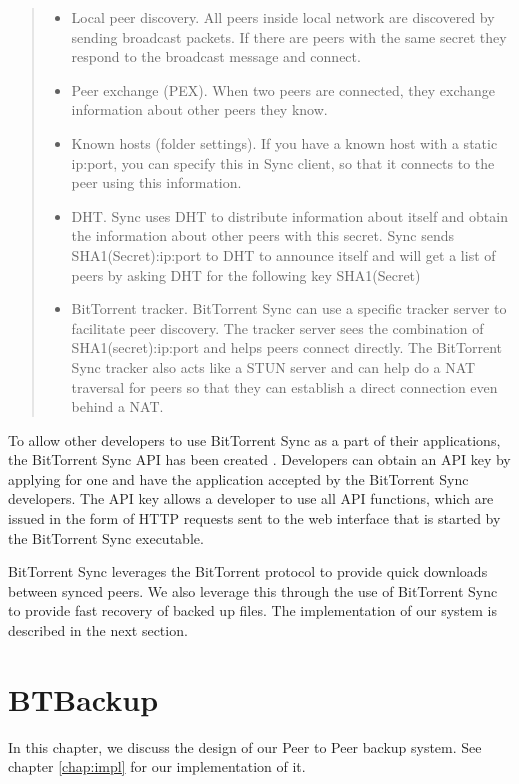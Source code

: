 \documentclass[12pt]{report}
\begin{document}
\begin{quote}
\begin{itemize}
\item Local peer discovery. All peers inside local network are discovered by sending broadcast packets. If there are peers with the same secret they respond to the broadcast message and connect.
\item Peer exchange (PEX). When two peers are connected, they exchange information about other peers they know.
\item Known hosts (folder settings). If you have a known host with a static ip:port, you can specify this in Sync client, so that it connects to the peer using this information.
\item DHT. Sync uses DHT to distribute information about itself and obtain the information about other peers with this secret. Sync sends SHA1(Secret):ip:port to DHT to announce itself and will get a list of peers by asking DHT for the following key SHA1(Secret)
\item BitTorrent tracker. BitTorrent Sync can use a specific tracker server to facilitate peer discovery. The tracker server sees the combination of SHA1(secret):ip:port and helps peers connect directly. The BitTorrent Sync tracker also acts like a STUN server and can help do a NAT traversal for peers so that they can establish a direct connection even behind a NAT.
\end{itemize}
\end{quote}

To allow other developers to use BitTorrent Sync as a part of their applications, the BitTorrent Sync API has been created \cite{btsyncapi}. Developers can obtain an API key by applying for one and have the application accepted by the BitTorrent Sync developers. The API key allows a developer to use all API functions, which are issued in the form of HTTP requests sent to the web interface that is started by the BitTorrent Sync executable.

BitTorrent Sync leverages the BitTorrent protocol to provide quick downloads between synced peers. We also leverage this through the use of BitTorrent Sync to provide fast recovery of backed up files. The implementation of our system is described in the next section.

\chapter{BTBackup}

In this chapter, we discuss the design of our Peer to Peer backup system. See chapter \ref{chap:impl} for our implementation of it.
\end{document}
